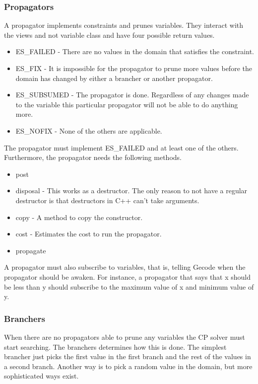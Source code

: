 \documentclass[a4paper,11pt]{article}
\begin{document}
\subsubsection{Propagators}
A propagator implements constraints and prunes variables. They interact with the views and not variable class and have four possible return values.
\begin{itemize}
\item{ES\_FAILED} - There are no values in the domain that satisfies the constraint.
\item{ES\_FIX} - It is impossible for the propagator to prune more values before the domain has changed by either a brancher or another propagator.
\item{ES\_SUBSUMED} - The propagator is done. Regardless of any changes made to the variable this particular propagator will not be able to do anything more.
\item{ES\_NOFIX} - None of the others are applicable.
\end{itemize}
The propagator must implement ES\_FAILED and at least one of the others. Furthermore, the propagator needs the following methods.
\begin{itemize}
\item{post}
\item{disposal} - This works as a destructor. The only reason to not have a regular destructor is that destructors in C++ can't take arguments.
\item{copy} - A method to copy the constructor.
\item{cost} - Estimates the cost to run the propagator.
\item{propagate}
\end{itemize}
A propagator must also subscribe to variables, that is, telling Gecode when the propagator should be awaken. For instance, a propagator that says that x should be less than y should subscribe to the maximum value of x and minimum value of y.

\subsubsection{Branchers}
When there are no propagators able to prune any variables the CP solver must start searching. The branchers determines how this is done. The simplest brancher just picks the first value in the first branch and the rest of the values in a second branch. Another way is to pick a random value in the domain, but more sophisticated ways exist.
\end{document}
